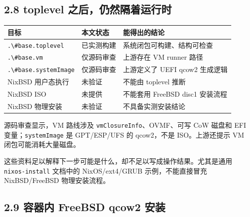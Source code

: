 \documentclass[
  11pt,
  UTF8,
  a4paper,
  fontset=fandol]{ctexart}
\newcommand{\passthrough}[1]{#1}
\begin{document}
\subsection{2.8 toplevel
之后，仍然隔着运行时}\label{toplevel-ux4e4bux540eux4ecdux7136ux9694ux7740ux8fd0ux884cux65f6}

\begin{longtable}[]{@{}
  >{\raggedright\arraybackslash}p{}
  >{\raggedright\arraybackslash}p{}
  >{\raggedright\arraybackslash}p{}@{}}
\toprule\noalign{}
\begin{minipage}[b]{\linewidth}\raggedright
目标
\end{minipage} & \begin{minipage}[b]{\linewidth}\raggedright
本文状态
\end{minipage} & \begin{minipage}[b]{\linewidth}\raggedright
能得出的结论
\end{minipage} \\
\midrule\noalign{}
\endhead
\bottomrule\noalign{}
\endlastfoot
\passthrough{\lstinline!.\#base.toplevel!} & 已实测构建 &
系统闭包可构建、结构可检查 \\
\passthrough{\lstinline!.\#base.vm!} & 仅源码审查 & 上游存在 VM runner
路径 \\
\passthrough{\lstinline!.\#base.systemImage!} & 仅源码审查 & 上游定义了
UEFI qcow2 生成逻辑 \\
NixBSD 用户态执行 & 未验证 & 不能由 toplevel 推断 \\
NixBSD ISO & 未提供 & 不能套用 FreeBSD disc1 安装流程 \\
NixBSD 物理安装 & 未验证 & 不具备实测安装结论 \\
\end{longtable}

源码审查显示，VM 路线涉及
\passthrough{\lstinline!vmClosureInfo!}、OVMF、可写 CoW 磁盘和 EFI
变量；\passthrough{\lstinline!systemImage!} 是 GPT/ESP/UFS 的
qcow2，不是 ISO。上游还提示 VM 闭包可能消耗大量磁盘。

这些资料足以解释下一步可能是什么，却不足以写成操作结果。尤其是通用
\passthrough{\lstinline!nixos-install!} 文档中的 NixOS/ext4/GRUB
示例，不能直接冒充 NixBSD/FreeBSD 物理安装流程。

\subsection{2.9 容器内 FreeBSD qcow2
安装}\label{ux5bb9ux5668ux5185-freebsd-qcow2-ux5b89ux88c5}
\end{document}
